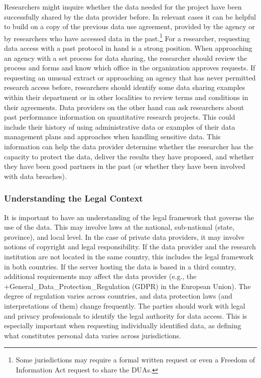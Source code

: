 \documentclass[
]{WileySix}
\begin{document}
Researchers might inquire whether the data needed for the project have been successfully shared by the data provider before. In relevant cases it can be helpful to build on a copy of the previous data use agreement, provided by the agency or by researchers who have accessed data in the past.\footnote{Some jurisdictions may require a formal written request or even a Freedom of Information Act request to share the DUAs.} For a researcher, requesting data access with a past protocol in hand is a strong position. When approaching an agency with a set process for data sharing, the researcher should review the process and forms and know which office in the organization approves requests. If requesting an unusual extract or approaching an agency that has never permitted research access before, researchers should identify some data sharing examples within their department or in other localities to review terms and conditions in their agreements. Data providers on the other hand can ask researchers about past performance information on quantitative research projects. This could include their history of using administrative data or examples of their data management plans and approaches when handling sensitive data. This information can help the data provider determine whether the researcher has the capacity to protect the data, deliver the results they have proposed, and whether they have been good partners in the past (or whether they have been involved with data breaches).

\hypertarget{understanding-the-legal-context}{%
\subsubsection{Understanding the Legal Context}\label{understanding-the-legal-context}}

It is important to have an understanding of the legal framework that governs the use of the data. This may involve laws at the national, sub-national (state, province), and local level. In the case of private data providers, it may involve notions of copyright and legal responsibility. If the data provider and the research institution are not located in the same country, this includes the legal framework in both countries. If the server hosting the data is based in a third country, additional requirements may affect the data provider (e.g., the +General\_Data\_Protection\_Regulation\textbar{} (GDPR) in the European Union). The degree of regulation varies across countries, and data protection laws (and interpretations of them) change frequently. The parties should work with legal and privacy professionals to identify the legal authority for data access. This is especially important when requesting individually identified data, as defining what constitutes personal data varies across jurisdictions.
\end{document}
